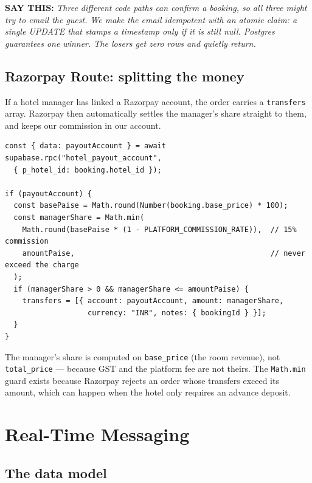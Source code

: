 \documentclass[11pt,a4paper]{article}
\newcommand{\saythis}[1]{\begin{saybox}\textbf{\small\color{primary}SAY THIS:} \textit{#1}\end{saybox}}
\begin{document}
\saythis{Three different code paths can confirm a booking, so all three might try
to email the guest. We make the email idempotent with an atomic claim: a single
UPDATE that stamps a timestamp only if it is still null. Postgres guarantees one
winner. The losers get zero rows and quietly return.}

\subsection{Razorpay Route: splitting the money}

If a hotel manager has linked a Razorpay account, the order carries a
\texttt{transfers} array. Razorpay then automatically settles the manager's share
straight to them, and keeps our commission in our account.

\begin{lstlisting}[language=TS,caption={app/api/payments/razorpay/order/route.ts}]
const { data: payoutAccount } = await supabase.rpc("hotel_payout_account",
  { p_hotel_id: booking.hotel_id });

if (payoutAccount) {
  const basePaise = Math.round(Number(booking.base_price) * 100);
  const managerShare = Math.min(
    Math.round(basePaise * (1 - PLATFORM_COMMISSION_RATE)),  // 15% commission
    amountPaise,                                             // never exceed the charge
  );
  if (managerShare > 0 && managerShare <= amountPaise) {
    transfers = [{ account: payoutAccount, amount: managerShare,
                   currency: "INR", notes: { bookingId } }];
  }
}
\end{lstlisting}

The manager's share is computed on \texttt{base\_price} (the room revenue), not
\texttt{total\_price} --- because GST and the platform fee are not theirs. The
\texttt{Math.min} guard exists because Razorpay rejects an order whose transfers
exceed its amount, which can happen when the hotel only requires an advance
deposit.

\newpage
\section{Real-Time Messaging}
\label{sec:messaging}

\subsection{The data model}
\end{document}
